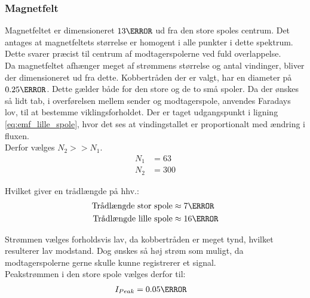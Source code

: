 \subsubsection{Magnetfelt}
Magnetfeltet er dimensioneret $13\mm$ ud fra den store spoles centrum.
Det antages at magnetfeltets størrelse er homogent i alle punkter i dette spektrum.
Dette svarer præcist til centrum af modtagerspolerne ved fuld overlappelse.\\
Da magnetfeltet afhænger meget af strømmens størrelse og antal vindinger, bliver der dimensioneret ud fra dette.
Kobbertråden der er valgt, har en diameter på $0.25\mm$.
Dette gælder både for den store og de to små spoler.
Da der ønskes så lidt tab, i overførelsen mellem sender og modtagerspole, anvendes Faradays lov, til at bestemme viklingsforholdet.
Der er taget udgangspunkt i ligning \ref{eq:emf_lille_spole}, hvor det ses at vindingstallet er proportionalt med ændring i fluxen. \\
Derfor vælges $N_2>>N_1$.
\begin{align}
	N_1 & = 63 \nonumber \\
	N_2 & = 300 \nonumber
\end{align}

Hvilket giver en trådlængde på hhv.:
\begin{align}
	\text{Trådlængde stor spole} & \approx 7\m  \nonumber \\
	\text{Trådlængde lille spole} & \approx 16\m \nonumber
\end{align}

Strømmen vælges forholdsvis lav, da kobbertråden er meget tynd, hvilket resulterer lav modstand. 
Dog ønskes så høj strøm som muligt, da modtagerspolerne gerne skulle kunne registrerer et signal.\\
Peakstrømmen i den store spole vælges derfor til:
\begin{align}
	I_{Peak} &= 0.05\ampere \nonumber
\end{align}

